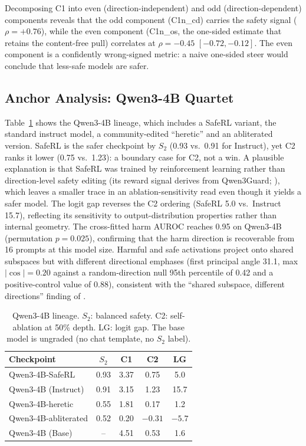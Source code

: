 \documentclass[11pt,letterpaper]{article}
\begin{document}
Decomposing C1 into even (direction-independent) and odd
(direction-dependent) components reveals that the odd component (C1n\_cd)
carries the safety signal ($\rho = +0.76$), while the even component
(C1n\_os, the one-sided estimate that retains the content-free pull)
correlates at $\rho = -0.45$ $[-0.72, -0.12]$. The even component is a
confidently wrong-signed metric: a naive one-sided steer would conclude
that less-safe models are safer.

\subsection{Anchor Analysis: Qwen3-4B Quartet}
\label{sec:anchor}

Table~\ref{tab:anchor} shows the Qwen3-4B lineage, which includes a
SafeRL variant, the standard instruct model, a community-edited
``heretic'' and an abliterated version. SafeRL is the safer checkpoint by
$S_2$ (0.93 vs.\ 0.91 for Instruct), yet C2 ranks it lower (0.75
vs.\ 1.23): a boundary case for C2, not a win. A plausible explanation is
that SafeRL was trained by reinforcement learning rather than
direction-level safety editing (its reward signal derives from Qwen3Guard;
\citealt{Zhao2025b}), which leaves a smaller trace in an
ablation-sensitivity read even though it yields a safer model. The logit
gap reverses the C2 ordering (SafeRL 5.0 vs.\ Instruct 15.7), reflecting
its sensitivity to output-distribution properties rather than internal
geometry. The cross-fitted harm AUROC reaches 0.95 on Qwen3-4B
(permutation $p = 0.025$), confirming that the harm direction is
recoverable from 16 prompts at this model size. Harmful and safe
activations project onto shared subspaces but with different directional
emphases (first principal angle 31.1\textdegree, max $|\cos| = 0.20$
against a random-direction null 95th percentile of 0.42 and a
positive-control value of 0.88), consistent with the ``shared subspace,
different directions'' finding of \citet{Zhao2025}.

\begin{table}[!htbp]
\centering
\small
\caption{Qwen3-4B lineage. $S_2$: balanced safety. C2: self-ablation at
50\% depth. LG: logit gap. The base model is ungraded (no chat template,
no $S_2$ label).}
\label{tab:anchor}
\begin{tabular}{@{}lcccc@{}}
\toprule
Checkpoint & $S_2$ & C1 & C2 & LG \\
\midrule
Qwen3-4B-SafeRL       & 0.93 & 3.37 & 0.75  & 5.0  \\
Qwen3-4B (Instruct)   & 0.91 & 3.15 & 1.23  & 15.7 \\
Qwen3-4B-heretic      & 0.55 & 1.81 & 0.17  & 1.2  \\
Qwen3-4B-abliterated  & 0.52 & 0.20 & $-0.31$ & $-5.7$ \\
Qwen3-4B (Base)       & --   & 4.51 & 0.53  & 1.6  \\
\bottomrule
\end{tabular}
\end{table}
\end{document}
